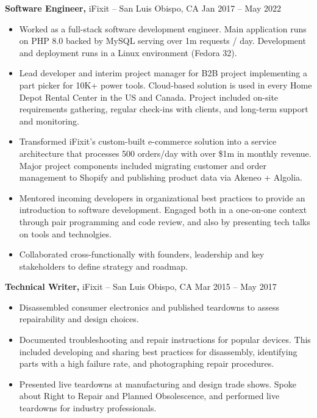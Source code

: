 \documentclass[11pt]{article}       %
\begin{document}
\textbf{Software Engineer,} {iFixit} -- San Luis Obispo, CA \hfill Jan 2017 -- May 2022 \\
\vspace{-9pt}
\begin{itemize}
  \item Worked as a full-stack software development engineer. Main application runs on PHP 8.0 backed by MySQL serving over 1m requests / day. Development and deployment runs in a Linux environment (Fedora 32). \\
  \item Lead developer and interim project manager for B2B project implementing a part picker for 10K+ power tools. Cloud-based solution is used in every Home Depot Rental Center in the US and Canada. Project included on-site requirements gathering, regular check-ins with clients, and long-term support and monitoring. \\
  \item Transformed iFixit’s custom-built e-commerce solution into a service architecture that processes 500 orders/day with over \$1m in monthly revenue. Major project components included migrating customer and order management to Shopify and publishing product data via Akeneo + Algolia. \\
  \item Mentored incoming developers in organizational best practices to provide an introduction to software development. Engaged both in a one-on-one context through pair programming and code review, and also by presenting tech talks on tools and technolgies. \\
  \item Collaborated cross-functionally with founders, leadership and key stakeholders to define strategy and roadmap. \\
\end{itemize}

\textbf{Technical Writer,} {iFixit} -- San Luis Obispo, CA \hfill Mar 2015 -- May 2017 \\
\vspace{-9pt}
\begin{itemize}
  \item Disassembled consumer electronics and published teardowns to assess repairability and design choices. \\
  \item Documented troubleshooting and repair instructions for popular devices. This included developing and sharing best practices for disassembly, identifying parts with a high failure rate, and photographing repair procedures. \\
  \item Presented live teardowns at manufacturing and design trade shows. Spoke about Right to Repair and Planned Obsolescence, and performed live teardowns for industry professionals. \\
\end{itemize}
\end{document}
